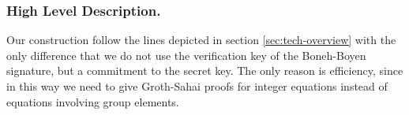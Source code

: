 

%
%
%


\subsubsection{High Level Description.} %
%
Our construction follow the lines depicted in section \ref{sec:tech-overview} with the only difference that we do not use the verification key of the Boneh-Boyen signature, but a commitment to the secret key. The only reason is efficiency, since in this way we need to give Groth-Sahai proofs for integer equations instead of equations involving group elements. 

